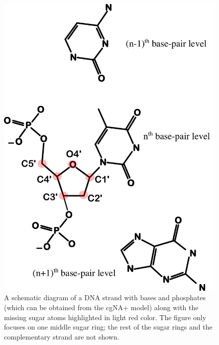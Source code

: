 \begin{figure}[htb]
	\begin{center}
	\includegraphics[scale=0.35]{images/DNA_chemical_structure_orig_2.pdf}
	\caption{A schematic diagram of a DNA strand with bases and phosphates (which can be obtained from the cgNA$+$ model) along with the missing sugar atoms highlighted in light red color. 
	The figure only focuses on one middle sugar ring; the rest of the sugar rings and the complementary strand are not shown.
	}
\label{c7:fig_backbone}
\end{center}
\end{figure}
\clearpage

